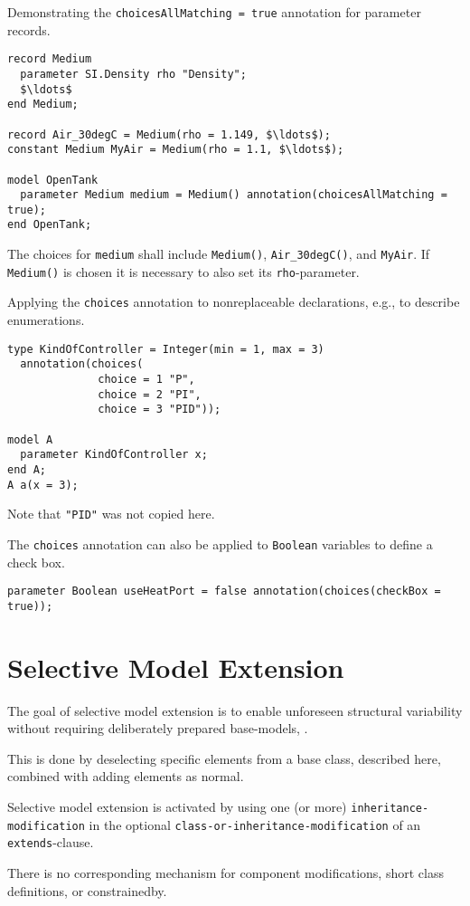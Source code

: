 \begin{example}
Demonstrating the \lstinline!choicesAllMatching = true! annotation for parameter records.
\begin{lstlisting}[language=modelica]
record Medium
  parameter SI.Density rho "Density";
  $\ldots$
end Medium;

record Air_30degC = Medium(rho = 1.149, $\ldots$);
constant Medium MyAir = Medium(rho = 1.1, $\ldots$);

model OpenTank
  parameter Medium medium = Medium() annotation(choicesAllMatching = true);
end OpenTank;
\end{lstlisting}
The choices for \lstinline!medium! shall include \lstinline!Medium()!, \lstinline!Air_30degC()!, and \lstinline!MyAir!.
If \lstinline!Medium()! is chosen it is necessary to also set its \lstinline!rho!-parameter.
\end{example}

\begin{example}
Applying the \lstinline!choices! annotation to nonreplaceable declarations, e.g., to describe enumerations.
\begin{lstlisting}[language=modelica]
type KindOfController = Integer(min = 1, max = 3)
  annotation(choices(
              choice = 1 "P",
              choice = 2 "PI",
              choice = 3 "PID"));

model A
  parameter KindOfController x;
end A;
A a(x = 3);
\end{lstlisting}
Note that \lstinline!"PID"! was not copied here.

The \lstinline!choices! annotation can also be applied to \lstinline!Boolean! variables to define a check box.
\begin{lstlisting}[language=modelica]
parameter Boolean useHeatPort = false annotation(choices(checkBox = true));
\end{lstlisting}
\end{example}

\section{Selective Model Extension}\label{selective-model-extension}
\begin{nonnormative}
The goal of selective model extension is to enable unforeseen structural variability without requiring deliberately prepared base-models, \textcite{Buerger2019SelectiveModel}.

This is done by deselecting specific elements from a base class, described here, combined with adding elements as normal.
\end{nonnormative}
Selective model extension is activated by using one (or more) \lstinline[language=grammar]!inheritance-modification! in the optional \lstinline[language=grammar]!class-or-inheritance-modification! of an \lstinline!extends!-clause.
\begin{nonnormative}
There is no corresponding mechanism for component modifications, short class definitions, or constrainedby.
\end{nonnormative}


